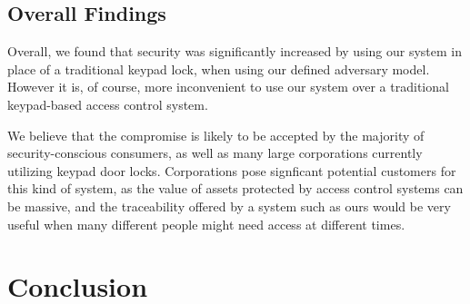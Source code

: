 \documentclass[conference]{IEEEtran}
\begin{document}
\subsection{Overall Findings}
Overall, we found that security was significantly increased by using our system in place of a traditional keypad lock, when using our defined adversary model.
However it is, of course, more inconvenient to use our system over a traditional keypad-based access control system. 

We believe that the compromise is likely to be accepted by the majority of security-conscious consumers, as well as many large corporations currently utilizing keypad door locks.
Corporations pose signficant potential customers for this kind of system, as the value of assets protected by access control systems can be massive, and the traceability offered by a system such as ours would be very useful when many different people might need access at different times.

\section{Conclusion}




\end{document}
